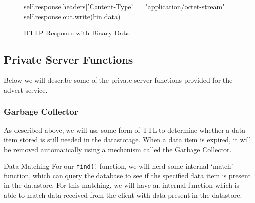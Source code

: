 \begin{figure*}[ht] %
\begin{center}
\begin{code}
self.response.headers['Content-Type'] = "application/octet-stream"
self.response.out.write(bin.data)
\end{code}
\caption{HTTP Response with Binary Data.\label{serverimpl-bin-response}}
\end{center}
\end{figure*}

\subsection{Private Server Functions}
Below we will describe some of the private server functions provided for the
advert service.

\subsubsection{Garbage Collector}
As described above, we will use some form of TTL to determine whether a data item
stored is still needed in the datastorage. When a data item is expired, it will
be removed automatically using a mechanism called the Garbage Collector.

Data Matching
For our \texttt{find()} function, we will need some internal `match' function,
which can query the database to see if the specified data item is present in the
datastore. For this matching, we will have an internal function which is able to
match data received from the client with data present in the datastore. 


